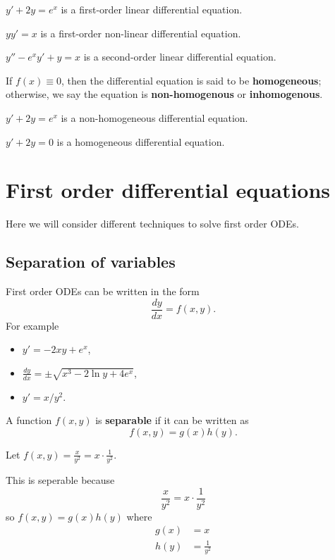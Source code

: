\begin{example}
\(y'+2y=e^x\) is a first-order linear differential equation.

\(yy'=x\) is a first-order non-linear differential equation.

\(y'' - e^xy' + y=x\) is a second-order linear differential equation.
\end{example}

\begin{definition}
If $f(x)\equiv0$, then the differential equation is said to be \textbf{homogeneous}; otherwise, we say the equation is \textbf{non-homogenous} or \textbf{inhomogenous}.
\end{definition}

\begin{example}
\(y'+2y=e^x\) is a non-homogeneous differential equation.

\(y'+2y=0\) is a homogeneous differential equation.
\end{example}

\section{First order differential equations}
Here we will consider different techniques to solve first order ODEs.

\subsection{Separation of variables}
First order ODEs can be written in the form \[\frac{dy}{dx}=f(x,y).\]
For example
\begin{itemize}
\item[ ] $y'=-2xy+e^x$,
\item[ ] $\frac{dy}{dx}=\pm \sqrt{x^3-2\ln y+4e^x}$,
\item[ ] $y'=x/y^2$.
\end{itemize}

\begin{definition}
A function $f(x,y)$ is \textbf{separable} if it can be written as
\[f(x,y)=g(x)h(y).\]
\end{definition}

\begin{example}
Let \(\displaystyle f(x,y)=\frac{x}{y^2}=x\cdot\frac{1}{y^2}\).

This is seperable because
\[\frac{x}{y^2} = x\cdot\frac{1}{y^2}\]
so \(f(x,y) = g(x)h(y)\) where
\begin{align*}
g(x) &= x\\
h(y) &= \frac{1}{y^2}
\end{align*}
\end{example}

